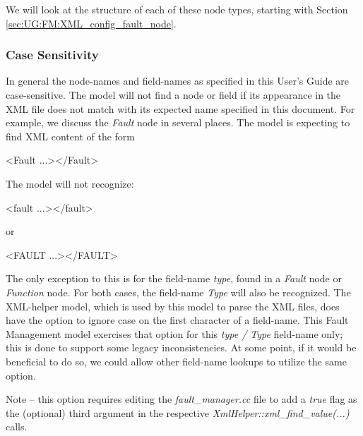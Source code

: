 \documentclass[11pt,fleqn]{report}
\begin{document}
We will look at the structure of each of these node types, starting with
Section \ref{sec:UG:FM:XML_config_fault_node}.

\subsubsection{Case Sensitivity}
\label{sec:UG:FM:Config_xml:case}
In general the node-names and field-names as specified in this User's Guide
are case-sensitive. The model will not find a node or field if its appearance
in the XML file does not match with its expected name specified in this
document. For example, we discuss the \textit{Fault} node in several places.
The model is expecting to find XML content of the form
\begin{codeXML}
<Fault ...></Fault>
\end{codeXML}

The model will not recognize:
\begin{codeXML}
<fault ...></fault>
\end{codeXML}
or
\begin{codeXML}
<FAULT ...></FAULT>
\end{codeXML}

The only exception to this is for the field-name \textit{type}, found in a
\textit{Fault} node or \textit{Function} node. For both cases, the
field-name \textit{Type} will also be recognized. The XML-helper model, which is
used by this model to parse the XML files, does have the option to ignore
case on the first character of a field-name. This Fault Management model
exercises that
option for this  \textit{type / Type} field-name only; this is done to
support some legacy inconsistencies. At some point, if it would be
beneficial to do so, we could allow other
field-name lookups to utilize the same option.

Note -- this option requires editing the \textit{fault\_manager.cc} file
to add a \textit{true} flag as the (optional) third argument in the
respective \textit{XmlHelper::xml\_find\_value(...)} calls.
\end{document}
